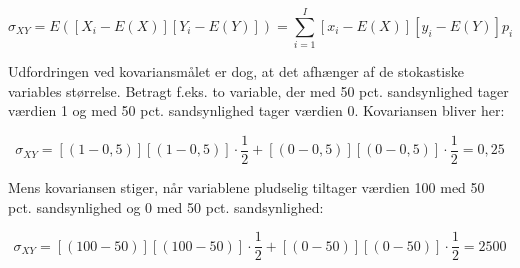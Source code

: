 \documentclass[10pt,reqno, usenames]{article}
\begin{document}
\begin{equation}
    \sigma_{XY} = E\left( [X_i - E(X)][Y_i - E(Y)] \right) = \sum_{i=1}^{I} \left[ x_i - E(X) \right] \left[ y_i - E(Y) \right] p_i
\end{equation}

Udfordringen ved kovariansmålet er dog, at det afhænger af de stokastiske variables størrelse. Betragt f.eks. to variable, der med 50 pct. sandsynlighed tager værdien 1 og med 50 pct. sandsynlighed tager værdien 0. Kovariansen bliver her: 

\begin{equation*}
    \sigma_{XY} = [(1-0,5)][(1-0,5)]\cdot \frac{1}{2} + [(0-0,5)][(0-0,5)]\cdot \frac{1}{2} = 0,25 
\end{equation*}

Mens kovariansen stiger, når variablene pludselig tiltager værdien 100 med 50 pct. sandsynlighed og 0 med 50 pct. sandsynlighed: 

\begin{equation*}
    \sigma_{XY} = [(100-50)][(100-50)]\cdot \frac{1}{2} + [(0-50)][(0-50)]\cdot \frac{1}{2} = 2500
\end{equation*}
\end{document}
